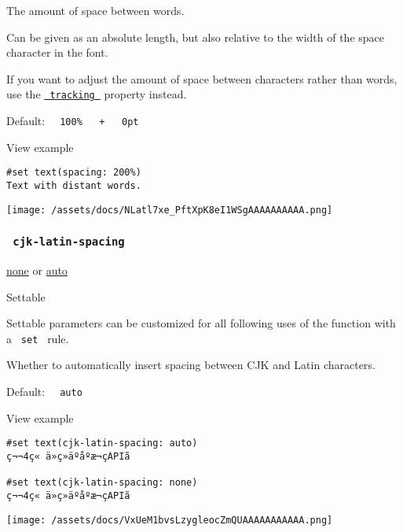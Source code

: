The amount of space between words.

Can be given as an absolute length, but also relative to the width of
the space character in the font.

If you want to adjust the amount of space between characters rather than
words, use the
\href{/docs/reference/text/text/\#parameters-tracking}{\texttt{\ tracking\ }}
property instead.

Default:
\texttt{\ }{\texttt{\ 100\%\ }}\texttt{\ }{\texttt{\ +\ }}\texttt{\ }{\texttt{\ 0pt\ }}\texttt{\ }


View example

\begin{verbatim}
#set text(spacing: 200%)
Text with distant words.
\end{verbatim}

\texttt{[image: /assets/docs/NLatl7xe\_PftXpK8eI1WSgAAAAAAAAAA.png]}

\subsubsection{\texorpdfstring{\texttt{\ cjk-latin-spacing\ }}{ cjk-latin-spacing }}\label{parameters-cjk-latin-spacing}

\href{/docs/reference/foundations/none/}{none} {or}
\href{/docs/reference/foundations/auto/}{auto}

{{ Settable }}

\label{parameters-cjk-latin-spacing-settable-tooltip}
Settable parameters can be customized for all following uses of the
function with a \texttt{\ set\ } rule.

Whether to automatically insert spacing between CJK and Latin
characters.

Default: \texttt{\ }{\texttt{\ auto\ }}\texttt{\ }


View example

\begin{verbatim}
#set text(cjk-latin-spacing: auto)
ç¬¬4ç« ä»ç»äºåºæ¬çAPIã

#set text(cjk-latin-spacing: none)
ç¬¬4ç« ä»ç»äºåºæ¬çAPIã
\end{verbatim}

\texttt{[image: /assets/docs/VxUeM1bvsLzygleocZmQUAAAAAAAAAAA.png]}

